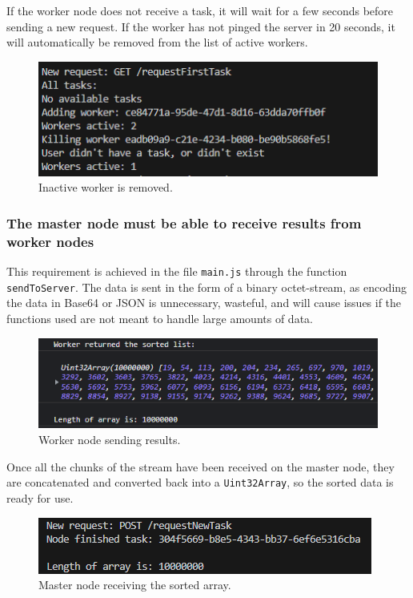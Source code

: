 If the worker node does not receive a task, it will wait for a few seconds before sending a new request. If the worker has not pinged the server in 20 seconds, it will automatically be removed from the list of active workers.

\begin{figure}[H]
    \centering
    \includegraphics[scale=1]{figures/InactiveWorkerRemoved.png}
    \caption{Inactive worker is removed.}
    \label{fig:Inactive worker removed}
\end{figure}

\subsubsection{The master node must be able to receive results from worker nodes}
This requirement is achieved in the file \lstinline{main.js} through the function \lstinline{sendToServer}. The data is sent in the form of a binary octet-stream, as encoding the data in Base64 or JSON is unnecessary, wasteful, and will cause issues if the functions used are not meant to handle large amounts of data.

\begin{figure}[H]
    \centering
    \includegraphics[scale=1]{figures/ArrayIsSent.png}
    \caption{Worker node sending results.}
    \label{fig:Sending sorted array to server}
\end{figure}

Once all the chunks of the stream have been received on the master node, they are concatenated and converted back into a \lstinline{Uint32Array}, so the sorted data is ready for use. 

\begin{figure}[H]
    \centering
    \includegraphics[scale=1.2]{figures/ReceivedArrayOnServer.png}
    \caption{Master node receiving the sorted array.}
    \label{fig:Receiving sorted array on server}
\end{figure}

